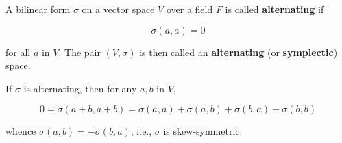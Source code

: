 A bilinear form $\sigma$ on a vector space $V$ over a field $F$ is called \textbf{alternating} if

$$\sigma(a, a) = 0$$

for all $a$ in $V$. The pair $(V, \sigma)$ is then called an \textbf{alternating} (or \textbf{symplectic}) space.

If $\sigma$ is alternating, then for any $a, b$ in $V$,

$$0 = \sigma(a + b, a + b) = \sigma(a, a) + \sigma(a, b) + \sigma(b, a) + \sigma(b, b)$$

whence $\sigma(a, b) = -\sigma(b, a)$, i.e., $\sigma$ is skew-symmetric.
